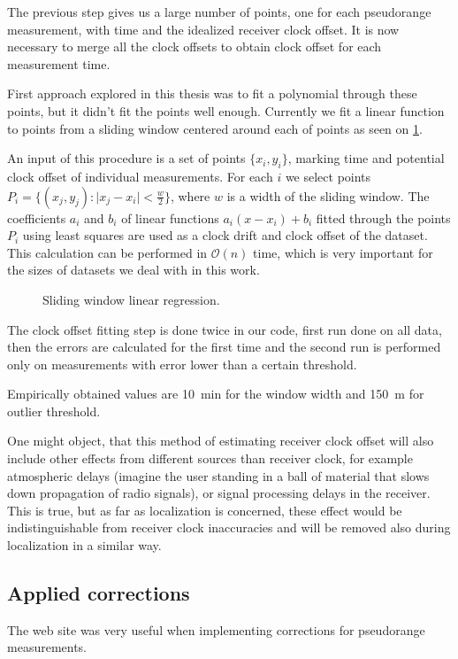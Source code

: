 The previous step gives us a large number of points, one for each pseudorange
measurement, with time and the idealized receiver clock offset.
It is now necessary to merge all the clock offsets to obtain clock offset for
each measurement time.

First approach explored in this thesis was to fit a polynomial through these
points, but it didn't fit the points well enough.
Currently we fit a linear function to points from a sliding window centered
around each of points as seen on \cref{fig:sliding-window-linear-regression}.

An input of this procedure is a set of points \(\{x_i, y_i\}\), marking 
time and potential clock offset of individual measurements.
For each \(i\) we select points \(P_i = \{(x_j, y_j) : \lvert{}x_j - x_i\rvert < \frac{w}{2}\}\), where
\(w\) is a width of the sliding window.
The coefficients \(a_i\) and \(b_i\) of linear functions
\(a_i (x - x_i) + b_i\) fitted through the points \(P_i\) using least squares
are used as a clock drift and clock offset of the dataset.
This calculation can be performed in \(\mathcal{O}(n)\) time, which is very
important for the sizes of datasets we deal with in this work.


\begin{figure}[h]
	\centering
	
	\caption{Sliding window linear regression.}
	\label{fig:sliding-window-linear-regression}
\end{figure}

The clock offset fitting step is done twice in our code, first run done on
all data, then the errors are calculated for the first time and the second run
is performed only on measurements with error lower than a certain threshold.

Empirically obtained values are \SI{10}{\minute} for the window width and
\SI{150}{\meter} for outlier threshold.

One might object, that this method of estimating receiver clock offset will
also include other effects from different sources than receiver clock,
for example atmospheric delays (imagine the user standing in a ball of material
that slows down propagation of radio signals), or signal processing delays
in the receiver.
This is true, but as far as localization is concerned, these effect would
be indistinguishable from receiver clock inaccuracies and will be
removed also during localization in a similar way.

\subsection{Applied corrections}
The web site \cite{sam-www} was very useful when implementing corrections for
pseudorange measurements.

